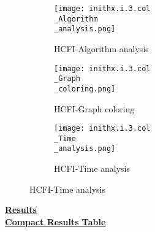 \documentclass[10pt]{article}
\begin{document}
\graphicspath{{./Core1/Solutions/HCFI/inithx.i.3.col}}
\begin{figure}[H]
\begin{subfigure}{.33\textwidth}
  \centering
  \texttt{[image: inithx.i.3.col\\\_Algorithm\\\_analysis.png]}
  \caption{HCFI-Algorithm analysis}
   \label{fig:subfig1}
\end{subfigure}%
\begin{subfigure}{.33\textwidth}
  \centering
  \texttt{[image: inithx.i.3.col\\\_Graph\\\_coloring.png]}
  \caption{HCFI-Graph coloring}
  \label{fig:subfig2}
\end{subfigure}
\begin{subfigure}{.33\textwidth}
  \centering
  \texttt{[image: inithx.i.3.col\\\_Time\\\_analysis.png]}
  \caption{HCFI-Time analysis}
  \end{subfigure}
\end{figure}
\vspace{2cm}
\begin{center}
\hyperlink{page.8}{\textbf{Results}}\\
\vspace{0.5cm}
\hyperlink{page.71}{\textbf{Compact Results Table}}
\end{center}
\pagebreak
\end{document}
